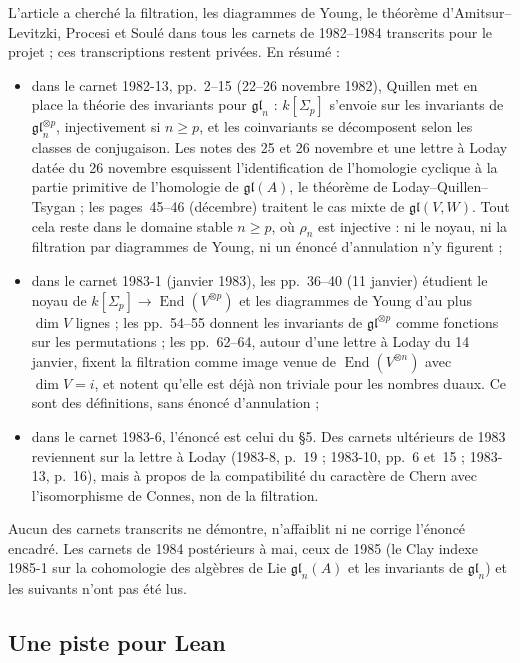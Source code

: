 \documentclass[11pt,a4paper]{amsart}
\theoremstyle{definition}
\theoremstyle{plain}
\theoremstyle{remark}
\newcommand{\gl}{\mathfrak{gl}}
\newcommand{\End}{\operatorname{End}}
\begin{document}
L'article a cherché la filtration, les diagrammes de Young, le théorème d'Amitsur--Levitzki, Procesi et Soulé dans tous les carnets de 1982--1984 transcrits pour le projet ; ces transcriptions restent privées. En résumé :
\begin{itemize}
\item dans le carnet 1982-13, pp.~2--15 (22--26 novembre 1982), Quillen met en place la théorie des invariants pour $\gl_n$ : $k[\Sigma_p]$ s'envoie sur les invariants de $\gl_n^{\otimes p}$, injectivement si $n \ge p$, et les coinvariants se décomposent selon les classes de conjugaison. Les notes des 25 et 26 novembre et une lettre à Loday datée du 26 novembre esquissent l'identification de l'homologie cyclique à la partie primitive de l'homologie de $\gl(A)$, le théorème de Loday--Quillen--Tsygan ; les pages~45--46 (décembre) traitent le cas mixte de $\gl(V, W)$. Tout cela reste dans le domaine stable $n \ge p$, où $\rho_n$ est injective : ni le noyau, ni la filtration par diagrammes de Young, ni un énoncé d'annulation n'y figurent ;
\item dans le carnet 1983-1 (janvier 1983), les pp.~36--40 (11 janvier) étudient le noyau de $k[\Sigma_p] \to \End(V^{\otimes p})$ et les diagrammes de Young d'au plus $\dim V$ lignes ; les pp.~54--55 donnent les invariants de $\gl^{\otimes p}$ comme fonctions sur les permutations ; les pp.~62--64, autour d'une lettre à Loday du 14 janvier, fixent la filtration comme image venue de $\End(V^{\otimes n})$ avec $\dim V = i$, et notent qu'elle est déjà non triviale pour les nombres duaux. Ce sont des définitions, sans énoncé d'annulation ;
\item dans le carnet 1983-6, l'énoncé est celui du \S5. Des carnets ultérieurs de 1983 reviennent sur la lettre à Loday (1983-8, p.~19 ; 1983-10, pp.~6 et~15 ; 1983-13, p.~16), mais à propos de la compatibilité du caractère de Chern avec l'isomorphisme de Connes, non de la filtration.
\end{itemize}
Aucun des carnets transcrits ne démontre, n'affaiblit ni ne corrige l'énoncé encadré. Les carnets de 1984 postérieurs à mai, ceux de 1985 (le Clay indexe 1985-1 sur la cohomologie des algèbres de Lie $\gl_n(A)$ et les invariants de $\gl_n$) et les suivants n'ont pas été lus.

\subsection{Une piste pour Lean}
\end{document}
